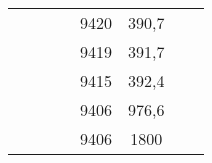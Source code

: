 \documentclass[11pt]{article}
\begin{document}
{{\begin{tabular}{cccc|c|c|c|c|}
            \cline{5-6} 
            &  &  &  & 9420 & 390,7 & \multicolumn{1}{c}{} & \multicolumn{1}{c}{}\tabularnewline
            \cline{5-6} 
            &  &  &  & 9419 & 391,7 & \multicolumn{1}{c}{} & \multicolumn{1}{c}{}\tabularnewline
            \cline{5-6} 
            &  &  &  & 9415 & 392,4 & \multicolumn{1}{c}{} & \multicolumn{1}{c}{}\tabularnewline
            \cline{5-6} 
            &  &  &  & 9406 & 976,6 & \multicolumn{1}{c}{} & \multicolumn{1}{c}{}\tabularnewline
            \cline{5-6} 
            &  &  &  & 9406 & 1800 & \multicolumn{1}{c}{} & \multicolumn{1}{c}{}\tabularnewline
            \cline{5-6} 
        \end{tabular}
    }
}
\vspace*{\fill}
\end{document}
